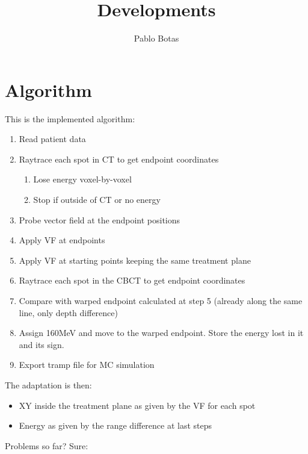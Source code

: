 \documentclass{article}
\title{Developments}
\author{Pablo Botas}
\begin{document}
\maketitle

\section{Algorithm}

This is the implemented algorithm:

\begin{enumerate}
    \item Read patient data
    \item Raytrace each spot in CT to get endpoint coordinates
    \begin{enumerate}
        \item Lose energy voxel-by-voxel
        \item Stop if outside of CT or no energy
    \end{enumerate}
    \item Probe vector field at the endpoint positions
    \item Apply VF at endpoints
    \item Apply VF at starting points keeping the same treatment plane
    \item Raytrace each spot in the CBCT to get endpoint coordinates
    \item Compare with warped endpoint calculated at step 5 (already along the same line, only depth difference)
    \item Assign 160MeV and move to the warped endpoint. Store the energy lost in it and its sign.
    \item Export tramp file for MC simulation
\end{enumerate}

The adaptation is then:
\begin{itemize}
    \item XY inside the treatment plane as given by the VF for each spot
    \item Energy as given by the range difference at last steps
\end{itemize}

Problems so far? Sure:
\newline

\end{document}
